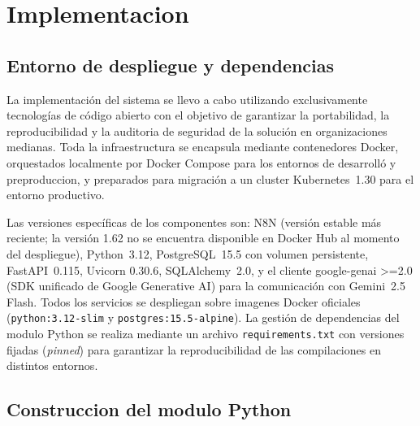 \section{Implementacion}

\subsection{Entorno de despliegue y dependencias}

La implementación del sistema se llevo a cabo utilizando exclusivamente tecnologías de código abierto con el objetivo de garantizar la portabilidad, la reproducibilidad y la auditoria de seguridad de la solución en organizaciones medianas. Toda la infraestructura se encapsula mediante contenedores Docker, orquestados localmente por Docker Compose para los entornos de desarrolló y preproduccion, y preparados para migración a un cluster Kubernetes~1.30 para el entorno productivo.

Las versiones específicas de los componentes son: N8N (versión estable más reciente; la versión 1.62 no se encuentra disponible en Docker Hub al momento del despliegue), Python~3.12, PostgreSQL~15.5 con volumen persistente, FastAPI~0.115, Uvicorn 0.30.6, SQLAlchemy~2.0, y el cliente google-genai >=2.0 (SDK unificado de Google Generative AI) para la comunicación con Gemini~2.5 Flash. Todos los servicios se despliegan sobre imagenes Docker oficiales (\texttt{python:3.12-slim} y \texttt{postgres:15.5-alpine}). La gestión de dependencias del modulo Python se realiza mediante un archivo \texttt{requirements.txt} con versiones fijadas (\emph{pinned}) para garantizar la reproducibilidad de las compilaciones en distintos entornos.

\subsection{Construccion del modulo Python}

